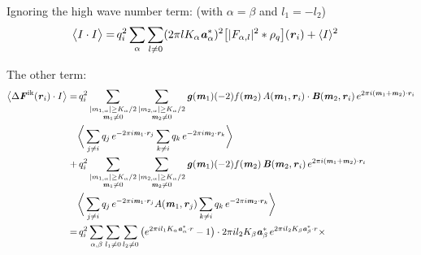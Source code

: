 \documentclass[aps,pre,preprint]{revtex4}
\renewcommand{\v}[1]{\textbf{\textit{#1}}}
\begin{document}
Ignoring the high wave number term: (with $\alpha = \beta$ and $l_1 = -l_2$)
\begin{align}\nonumber
  \big\langle
  I\cdot I
  \big\rangle
  = &\, 
  q_i^2
  \sum_{\alpha}\sum_{l\neq 0}
   (2\pi l K_\alpha\v a_\alpha^\ast)^2
  \big[
  \vert F_{\alpha,l} \vert^2
  \ast \rho_q
  \big]
  (\v r_i) + 
  \langle I\rangle^2
\end{align}


The other term:
\begin{align}\nonumber
  \big\langle
  \Delta\v F^{\textrm{ik}}(\v r_i)\cdot I
  \big\rangle
  = &\,
  q^2_i
  \sum_{
    \begin{subarray}{c}
      \vert m_{1,\alpha}\vert \geq K_\alpha/2\\
      \v m_1\neq 0
    \end{subarray}}
  \sum_{
    \begin{subarray}{c}
      \vert m_{2,\alpha}\vert \geq K_\alpha/2\\
      \v m_2\neq 0
    \end{subarray}}
  \v g(\v m_1) (-2)f(\v m_2) \,
  A(\v m_1, \v r_i)\cdot\v B(\v m_2, \v r_i)
  \,e^{2\pi i(\v m_1 + \v m_2)\cdot\v r_i} \\  \nonumber
  &
  \bigg\langle
  \sum_{j\neq i}q_j\,e^{-2\pi i\v m_1\cdot\v r_j}  
  \sum_{k\neq i}q_k\,e^{-2\pi i\v m_2\cdot\v r_k}
  \bigg\rangle \\\nonumber
  + &\,
  q^2_i
  \sum_{
    \begin{subarray}{c}
      \vert m_{1,\alpha}\vert \geq K_\alpha/2\\
      \v m_1\neq 0
    \end{subarray}}
  \sum_{
    \begin{subarray}{c}
      \vert m_{2,\alpha}\vert \geq K_\alpha/2\\
      \v m_2\neq 0
    \end{subarray}}
  \v g(\v m_1) (-2)f(\v m_2) \,
  \v B(\v m_2, \v r_i)
  \,e^{2\pi i(\v m_1 + \v m_2)\cdot\v r_i} \\  \nonumber
  &
  \bigg\langle
  \sum_{j\neq i}q_j\,e^{-2\pi i\v m_1\cdot\v r_j}A(\v m_1, \v r_j)
  \sum_{k\neq i}q_k\,e^{-2\pi i\v m_2\cdot\v r_k}
  \bigg\rangle \\\nonumber
  =&\,
  q^2_i
  \sum_{\alpha, \beta}\sum_{l_1\neq 0}\sum_{l_2\neq 0}
  \big(
  e^{2\pi i l_1 K_\alpha\v a_\alpha^\ast\cdot r} - 1
  \big)
  \cdot
  2\pi i l_2K_\beta \v a_\beta ^\ast\,e^{2\pi i l_2 K_\beta \v a_\beta^\ast\cdot r} \times \\\nonumber

\end{align}
\end{document}
